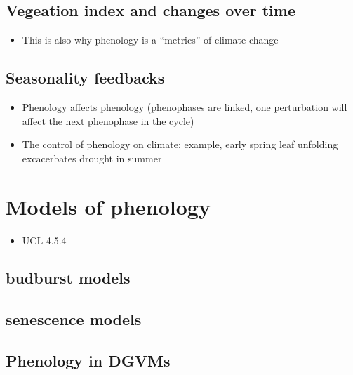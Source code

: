 \documentclass[
  oneside]{book}
\providecommand{\tightlist}{%
  \setlength{\itemsep}{0pt}\setlength{\parskip}{0pt}}
\begin{document}
\hypertarget{vegeation-index-and-changes-over-time}{%
\subsection{Vegeation index and changes over time}\label{vegeation-index-and-changes-over-time}}

\begin{itemize}
\tightlist
\item
  This is also why phenology is a ``metrics'' of climate change
\end{itemize}

\hypertarget{seasonality-feedbacks}{%
\subsection{Seasonality feedbacks}\label{seasonality-feedbacks}}

\begin{itemize}
\tightlist
\item
  Phenology affects phenology (phenophases are linked, one perturbation will affect the next phenophase in the cycle)
\item
  The control of phenology on climate: example, early spring leaf unfolding excacerbates drought in summer
\end{itemize}

\hypertarget{models-of-phenology}{%
\section{Models of phenology}\label{models-of-phenology}}

\begin{itemize}
\tightlist
\item
  UCL 4.5.4
\end{itemize}

\hypertarget{budburst-models}{%
\subsection{budburst models}\label{budburst-models}}

\hypertarget{senescence-models}{%
\subsection{senescence models}\label{senescence-models}}

\hypertarget{phenology-in-dgvms}{%
\subsection{Phenology in DGVMs}\label{phenology-in-dgvms}}
\end{document}
